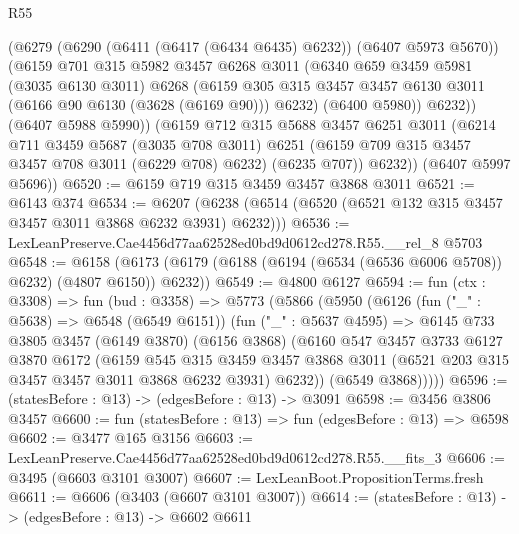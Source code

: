 \begin{lexlean}{R55}
\begin{coremodule}
          (@6279
            (@6290 (@6411 (@6417 (@6434 @6435) @6232)) (@6407 @5973 @5670))
            (@6159
              @701
              @315
              @5982
              @3457
              @6268
              @3011
              (@6340
                @659
                @3459
                @5981
                (@3035 @6130 @3011)
                @6268
                (@6159
                  @305
                  @315
                  @3457
                  @3457
                  @6130
                  @3011
                  (@6166 @90 @6130 (@3628 (@6169 @90)))
                  @6232)
                (@6400 @5980))
              @6232))
          (@6407 @5988 @5990))
        (@6159
          @712
          @315
          @5688
          @3457
          @6251
          @3011
          (@6214
            @711
            @3459
            @5687
            (@3035 @708 @3011)
            @6251
            (@6159 @709 @315 @3457 @3457 @708 @3011 (@6229 @708) @6232)
            (@6235 @707))
          @6232))
      (@6407 @5997 @5696))
@6520 := @6159 @719 @315 @3459 @3457 @3868 @3011
@6521 := @6143 @374
@6534 := @6207 (@6238 (@6514 (@6520 (@6521 @132 @315 @3457 @3457 @3011 @3868 @6232 @3931) @6232)))
@6536 := LexLeanPreserve.Cae4456d77aa62528ed0bd9d0612cd278.R55.__rel_8 @5703
@6548 := @6158 (@6173 (@6179 (@6188 (@6194 (@6534 (@6536 @6006 @5708)) @6232) (@4807 @6150)) @6232))
@6549 := @4800 @6127
@6594 := fun (ctx : @3308) =>
  fun (bud : @3358) =>
  @5773
    (@5866
      (@5950
        (@6126
          (fun ("_" : @5638) => @6548 (@6549 @6151))
          (fun ("_" : @5637 @4595) =>
          @6145
            @733
            @3805
            @3457
            (@6149 @3870)
            (@6156 @3868)
            (@6160
              @547
              @3457
              @3733
              @6127
              @3870
              @6172
              (@6159
                @545
                @315
                @3459
                @3457
                @3868
                @3011
                (@6521 @203 @315 @3457 @3457 @3011 @3868 @6232 @3931)
                @6232))
            (@6549 @3868)))))
@6596 := (statesBefore : @13) -> (edgesBefore : @13) -> @3091
@6598 := @3456 @3806 @3457
@6600 := fun (statesBefore : @13) => fun (edgesBefore : @13) => @6598
@6602 := @3477 @165 @3156
@6603 := LexLeanPreserve.Cae4456d77aa62528ed0bd9d0612cd278.R55.__fits_3
@6606 := @3495 (@6603 @3101 @3007)
@6607 := LexLeanBoot.PropositionTerms.fresh
@6611 := @6606 (@3403 (@6607 @3101 @3007))
@6614 := (statesBefore : @13) -> (edgesBefore : @13) -> @6602 @6611

\end{coremodule}
\end{lexlean}
